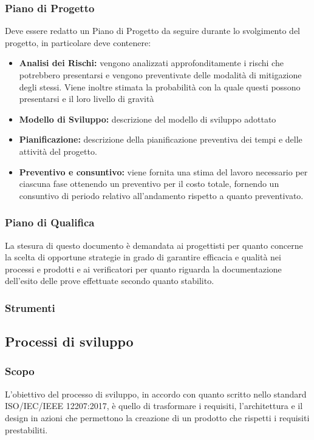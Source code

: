 \subsubsection{Piano di Progetto}
Deve essere redatto un Piano di Progetto da seguire durante lo svolgimento del progetto, in particolare deve contenere: 

\begin{itemize}
\item \textbf{Analisi dei Rischi:} vengono analizzati approfonditamente i rischi che potrebbero presentarsi e vengono preventivate delle modalità di mitigazione degli stessi. Viene inoltre stimata la probabilità con la quale questi possono presentarsi e il loro livello di gravità
\item \textbf{Modello di Sviluppo:} descrizione del modello di sviluppo adottato 
\item \textbf{Pianificazione:} descrizione della pianificazione preventiva dei tempi e delle attività del progetto.
\item \textbf{Preventivo e consuntivo:}  viene fornita una stima del lavoro necessario per ciascuna fase ottenendo un preventivo per il costo totale,  fornendo un consuntivo di periodo relativo all'andamento rispetto a quanto preventivato.
\end{itemize}

\subsubsection{Piano di Qualifica}
La stesura di questo documento è demandata ai progettisti per quanto concerne la scelta di opportune strategie in grado di garantire efficacia e qualità nei processi e prodotti e ai verificatori per quanto riguarda la documentazione dell'esito delle prove effettuate secondo quanto stabilito.


\subsubsection{Strumenti}




\subsection{Processi di sviluppo}
\subsubsection{Scopo}
L'obiettivo del processo di sviluppo, in accordo con quanto scritto nello standard ISO/IEC/IEEE 12207:2017, è quello di trasformare i requisiti, l'architettura e il design in azioni che permettono la creazione di un prodotto che rispetti i requisiti prestabiliti.

